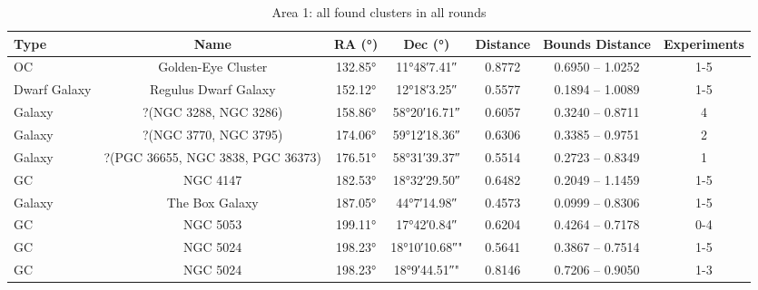 \begin{longtable}{l c c c c c c}
    \caption{Area 1: all found clusters in all rounds} \label{tb:results-raw-a1}                                                      \\

    \toprule
    Type         & Name                              & RA (°)       & Dec (°)             & Distance & Bounds Distance  & Experiments \\
    \midrule
    OC           & Golden-Eye Cluster                & \ang{132.85} & \ang{+11;48;7.41}   & 0.8772   & 0.6950 -- 1.0252 & 1-5         \\ %
    Dwarf Galaxy & Regulus Dwarf Galaxy              & \ang{152.12} & \ang{+12;18;3.25}   & 0.5577   & 0.1894 -- 1.0089 & 1-5         \\ %
    Galaxy       & ?(NGC 3288, NGC 3286)             & \ang{158.86} & \ang{+58;20;16.71}  & 0.6057   & 0.3240 -- 0.8711 & 4           \\ %
    Galaxy       & ?(NGC 3770, NGC 3795)             & \ang{174.06} & \ang{+59;12;18.36}  & 0.6306   & 0.3385 -- 0.9751 & 2           \\ %
    Galaxy       & ?(PGC 36655, NGC 3838, PGC 36373) & \ang{176.51} & \ang{+58;31;39.37}  & 0.5514   & 0.2723 -- 0.8349 & 1           \\ %
    GC           & NGC 4147                          & \ang{182.53} & \ang{+18;32;29.50}  & 0.6482   & 0.2049 -- 1.1459 & 1-5         \\ %
    Galaxy       & The Box Galaxy                    & \ang{187.05} & \ang{+44;7;14.98}   & 0.4573   & 0.0999 -- 0.8306 & 1-5         \\ %
    GC           & NGC 5053                          & \ang{199.11} & \ang{+17;42;0.84}   & 0.6204   & 0.4264 -- 0.7178 & 0-4         \\ %
    GC           & NGC 5024                          & \ang{198.23} & \ang{+18;10;10.68}" & 0.5641   & 0.3867 -- 0.7514 & 1-5         \\ %
    GC           & NGC 5024                          & \ang{198.23} & \ang{+18;9;44.51}"  & 0.8146   & 0.7206 -- 0.9050 & 1-3         \\ %

\end{longtable}
